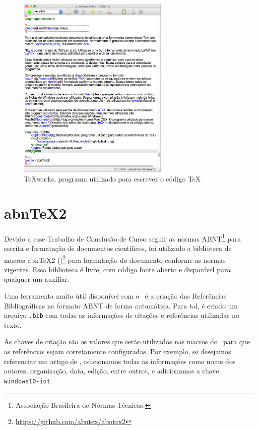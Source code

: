 \documentclass[
		12pt,				%
		openright,			%
		oneside,			%
		a4paper,			%
		chapter=TITLE,		%
		english,			%
		brazil				%
	]{abntex2}
\begin{document}
\begin{apendicesenv}
\begin{figure}[htb]
	\caption{\label{fig:texworks}TeXworks, programa utilizado para escrever o código \TeX}
	\begin{center}
		\includegraphics[width=0.65\textwidth]{img/texworks.jpg}
	\end{center}
\end{figure}

\section{abnTeX2}

Devido a esse Trabalho de Conclusão de Curso seguir as normas ABNT\footnote{Associação Brasileira de Normas Técnicas.} para escrita e formatação de documentos científicos, foi utilizado a biblioteca de macros abnTeX2 (\abnTeX)\footnote{\url{https://github.com/abntex/abntex2}} para formatação do documento conforme as normas vigentes. Essa biblioteca é livre, com código fonte aberto e disponível para qualquer um auxiliar.

Uma ferramenta muito útil disponível com o \abnTeX\ é a criação das Referências Bibliográficas no formato ABNT de forma automática. Para tal, é criado um arquivo \texttt{.bib} com todas as informações de citações e referências utilizadas no texto.

As chaves de citação são os valores que serão utilizados nas macros do \abnTeX\ para que as referências sejam corretamente configuradas. Por exemplo, se desejamos referenciar um artigo de , adicionamos todas as informações como nome dos autores, organização, data, edição, entre outros, e adicionamos a chave \texttt{windows10-iot}. 


\end{apendicesenv}
\end{document}
